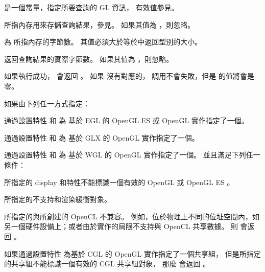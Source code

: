  是一個常量，指定所要查詢的 GL 資訊，
有效值參見。

{}

 所指內存用來存儲查詢結果，參見。
如果其值為 ，則忽略。

 為  所指內存的字節數。
其值必須大於等於中返回型別的大小。

 返回查詢結果的實際字節數。
如果其值為 ，則忽略。

如果執行成功，  會返回 。
如果  沒有對應的，
調用不會失敗，但是  的值將會是零。

如果由下列任一方式指定：
\startigBase[indentnext=no]
\item 通過設置特性  和  為
基於 EGL 的 OpenGL ES 或 OpenGL 實作指定了一個。

\item 通過設置特性  和  為
基於 GLX 的 OpenGL 實作指定了一個。

\item 通過設置特性  和  為
基於 WGL 的 OpenGL 實作指定了一個。
\stopigBase
並且滿足下列任一條件：
\startigBase[indentnext=no]
\item 所指定的 display 和特性不能標識一個有效的 OpenGL 或 OpenGL ES 。

\item 所指定的不支持和渲染緩衝對象。

\item 所指定的與所創建的 OpenCL 不兼容。
例如，位於物理上不同的位址空間內，如另一個硬件設備上；或者由於實作的局限不支持與 OpenCL 共享數據。
\stopigBase
則  會返回 。

如果通過設置特性  為基於 CGL 的 OpenGL 實作指定了一個共享組，
但是所指定的共享組不能標識一個有效的 CGL 共享組對象，
那麼  會返回 。

